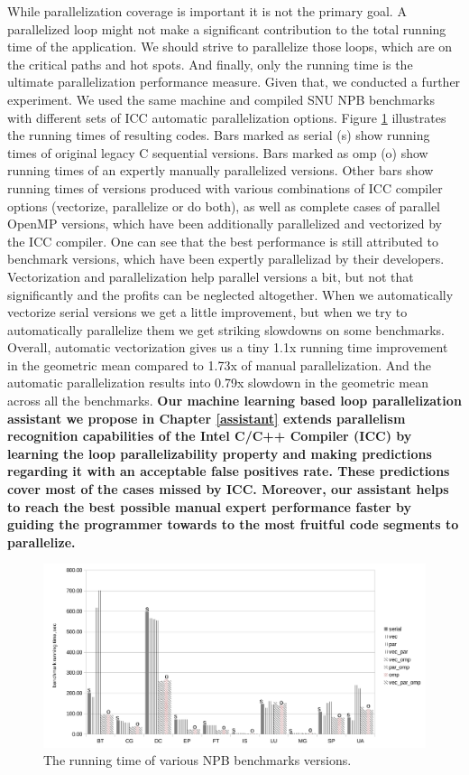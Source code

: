 \quad While parallelization coverage is important it is not the primary goal. A parallelized loop might not make a significant contribution to the total running time of the application. We should strive to parallelize those loops, which are on the critical paths and hot spots. And finally, only the running time is the ultimate parallelization performance measure. Given that, we conducted a further experiment. We used the same machine and compiled SNU NPB benchmarks with different sets of ICC automatic parallelization options. Figure \ref{fig:benchmarks_runtime} illustrates the running times of resulting codes. Bars marked as serial (s) show running times of original legacy C sequential versions. Bars marked as omp (o) show running times of an expertly manually parallelized versions. Other bars show running times of versions produced with various combinations of ICC compiler options (vectorize, parallelize or do both), as well as complete cases of parallel OpenMP versions, which have been additionally parallelized and vectorized by the ICC compiler. One can see that the best performance is still attributed to benchmark versions, which have been expertly parallelizad by their developers. Vectorization and parallelization help parallel versions a bit, but not that significantly and the profits can be neglected altogether. When we automatically vectorize serial versions we get a little improvement, but when we try to automatically parallelize them we get striking slowdowns on some benchmarks. Overall, automatic vectorization gives us a tiny 1.1x running time improvement in the geometric mean compared to 1.73x of manual parallelization. And the automatic parallelization results into 0.79x slowdown in the geometric mean across all the benchmarks.\newline\null
\textbf{\quad Our machine learning based loop parallelization assistant \cite{assistant-aiseps} we propose in Chapter \ref{assistant} extends parallelism recognition capabilities of the Intel C/C++ Compiler (ICC) by learning the loop parallelizability property and making predictions regarding it with an acceptable false positives rate. These predictions cover most of the cases missed by ICC. Moreover, our assistant helps to reach the best possible manual expert performance faster by guiding the programmer towards to the most fruitful code segments to parallelize.}
\begin{figure}[ht]
\includegraphics[width=1.0\textwidth]{images/benchmark_runtime.pdf}
\caption{The running time of various NPB benchmarks versions.}
\label{fig:benchmarks_runtime}
\end{figure}

